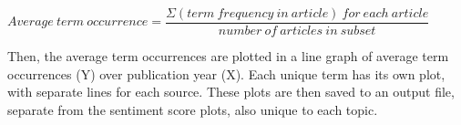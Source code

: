 \documentclass{report}
\begin{document}
\begin{center}
	$Average \ term \ occurrence = \dfrac{\Sigma (term \ frequency \ in \ article) \ for \ each \ article}{number \ of \ articles \ in \ subset}$
\end{center}

Then, the average term occurrences are plotted in a line graph of average term occurrences (Y) over publication year (X).
Each unique term has its own plot, with separate lines for each source. 
These plots are then saved to an output file, separate from the sentiment score plots, also unique to each topic. 





\end{document}
